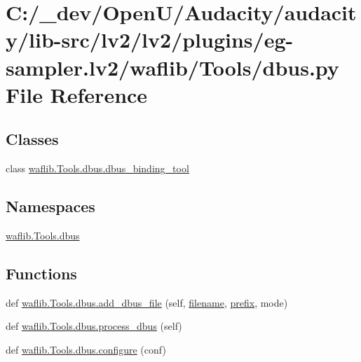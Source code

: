 \hypertarget{lv2_2plugins_2eg-sampler_8lv2_2waflib_2_tools_2dbus_8py}{}\section{C\+:/\+\_\+dev/\+Open\+U/\+Audacity/audacity/lib-\/src/lv2/lv2/plugins/eg-\/sampler.lv2/waflib/\+Tools/dbus.py File Reference}
\label{lv2_2plugins_2eg-sampler_8lv2_2waflib_2_tools_2dbus_8py}
\subsection*{Classes}
\begin{DoxyCompactItemize}
\item 
class \hyperlink{classwaflib_1_1_tools_1_1dbus_1_1dbus__binding__tool}{waflib.\+Tools.\+dbus.\+dbus\+\_\+binding\+\_\+tool}
\end{DoxyCompactItemize}
\subsection*{Namespaces}
\begin{DoxyCompactItemize}
\item 
 \hyperlink{namespacewaflib_1_1_tools_1_1dbus}{waflib.\+Tools.\+dbus}
\end{DoxyCompactItemize}
\subsection*{Functions}
\begin{DoxyCompactItemize}
\item 
def \hyperlink{namespacewaflib_1_1_tools_1_1dbus_a6984c3a3293d830848a5b9e06326a353}{waflib.\+Tools.\+dbus.\+add\+\_\+dbus\+\_\+file} (self, \hyperlink{test__portburn_8cpp_a7efa5e9c7494c7d4586359300221aa5d}{filename}, \hyperlink{structprefix}{prefix}, mode)
\item 
def \hyperlink{namespacewaflib_1_1_tools_1_1dbus_a75dbed39a93f5b22ad67c948e91f2008}{waflib.\+Tools.\+dbus.\+process\+\_\+dbus} (self)
\item 
def \hyperlink{namespacewaflib_1_1_tools_1_1dbus_abce63288e0395b45e8006bd6cc81edb7}{waflib.\+Tools.\+dbus.\+configure} (conf)
\end{DoxyCompactItemize}
